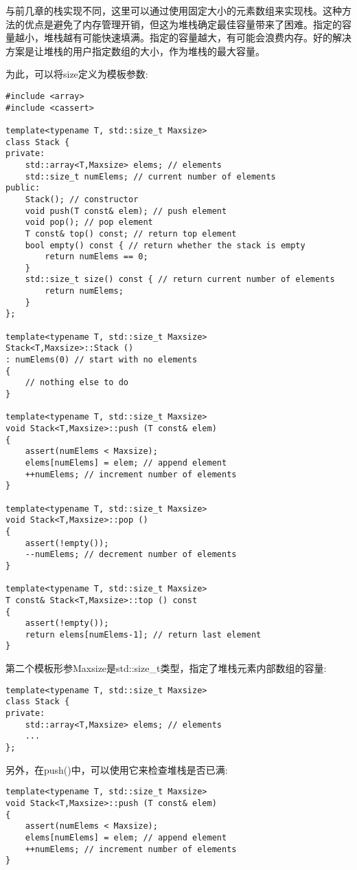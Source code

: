 与前几章的栈实现不同，这里可以通过使用固定大小的元素数组来实现栈。这种方法的优点是避免了内存管理开销，但这为堆栈确定最佳容量带来了困难。指定的容量越小，堆栈越有可能快速填满。指定的容量越大，有可能会浪费内存。好的解决方案是让堆栈的用户指定数组的大小，作为堆栈的最大容量。

为此，可以将size定义为模板参数:

\begin{lstlisting}[style=styleCXX]
#include <array>
#include <cassert>

template<typename T, std::size_t Maxsize>
class Stack {
private:
	std::array<T,Maxsize> elems; // elements
	std::size_t numElems; // current number of elements
public:
	Stack(); // constructor
	void push(T const& elem); // push element
	void pop(); // pop element
	T const& top() const; // return top element
	bool empty() const { // return whether the stack is empty
		return numElems == 0;
	}
	std::size_t size() const { // return current number of elements
		return numElems;
	}
};

template<typename T, std::size_t Maxsize>
Stack<T,Maxsize>::Stack ()
: numElems(0) // start with no elements
{
	// nothing else to do
}

template<typename T, std::size_t Maxsize>
void Stack<T,Maxsize>::push (T const& elem)
{
	assert(numElems < Maxsize);
	elems[numElems] = elem; // append element
	++numElems; // increment number of elements
}

template<typename T, std::size_t Maxsize>
void Stack<T,Maxsize>::pop ()
{
	assert(!empty());
	--numElems; // decrement number of elements
}

template<typename T, std::size_t Maxsize>
T const& Stack<T,Maxsize>::top () const
{
	assert(!empty());
	return elems[numElems-1]; // return last element
}
\end{lstlisting}

第二个模板形参Maxsize是std::size\_t类型，指定了堆栈元素内部数组的容量:

\begin{lstlisting}[style=styleCXX]
template<typename T, std::size_t Maxsize>
class Stack {
private:
	std::array<T,Maxsize> elems; // elements
	...
};
\end{lstlisting}

另外，在push()中，可以使用它来检查堆栈是否已满:

\begin{lstlisting}[style=styleCXX]
template<typename T, std::size_t Maxsize>
void Stack<T,Maxsize>::push (T const& elem)
{
	assert(numElems < Maxsize);
	elems[numElems] = elem; // append element
	++numElems; // increment number of elements
}
\end{lstlisting}

